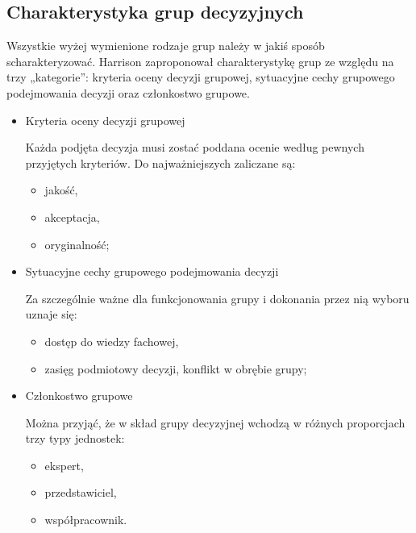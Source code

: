 \subsection{Charakterystyka grup decyzyjnych}
Wszystkie wyżej wymienione rodzaje grup należy w jakiś sposób scharakteryzować. 
Harrison \cite{Harrison1999} zaproponował charakterystykę grup ze względu na
trzy „kategorie”:
kryteria oceny decyzji grupowej, sytuacyjne cechy grupowego podejmowania decyzji
oraz członkostwo grupowe.

\begin{itemize}
  \item Kryteria oceny decyzji grupowej
  
  Każda podjęta decyzja musi zostać poddana ocenie według pewnych przyjętych
  kryteriów.
  Do najważniejszych zaliczane są:
  \begin{itemize}
    \item jakość, 
    \item akceptacja, 
    \item oryginalność;
  \end{itemize}
  
  \item Sytuacyjne cechy grupowego podejmowania decyzji
  
  Za szczególnie ważne dla funkcjonowania grupy i dokonania przez nią wyboru
  uznaje się:
  \begin{itemize}
    \item dostęp do wiedzy fachowej,
    \item zasięg podmiotowy decyzji,
    konflikt w obrębie grupy;
  \end{itemize}
  
  \item Członkostwo grupowe
  
  Można przyjąć, że w skład grupy decyzyjnej wchodzą w różnych proporcjach trzy
  typy jednostek:
  \begin{itemize}
    \item ekspert,
    \item przedstawiciel,
    \item współpracownik.
  \end{itemize}
\end{itemize}

